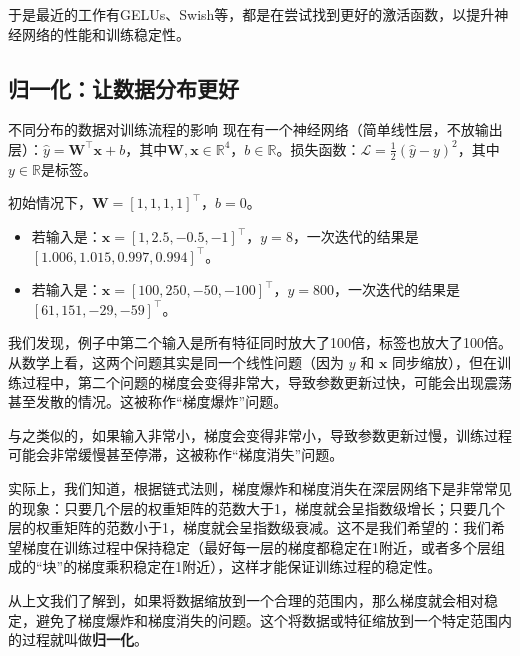 于是最近的工作有GELUs、Swish等，都是在尝试找到更好的激活函数，以提升神经网络的性能和训练稳定性。

\subsection{归一化：让数据分布更好}

\begin{example}{不同分布的数据对训练流程的影响}{}
    现在有一个神经网络（简单线性层，不放输出层）：$\hat{y} = \mathbf{W}^\top \mathbf{x} + b$，其中$\mathbf{W}, \mathbf{x} \in \mathbb{R}^{4}$，$b \in \mathbb{R}$。损失函数：$\mathcal{L} = \frac{1}{2}(\hat{y} - y)^2$，其中$y \in \mathbb{R}$是标签。

    初始情况下，$\mathbf{W} = [1, 1, 1, 1]^\top$，$b = 0$。

    \begin{itemize}
        \item 若输入是：$\mathbf{x} = [1, 2.5, -0.5, -1]^\top$，$y = 8$，一次迭代的结果是$[1.006,1.015,0.997,0.994]^\top$。
        \item 若输入是：$\mathbf{x} = [100, 250, -50, -100]^\top$，$y = 800$，一次迭代的结果是$[61,151,-29,-59]^\top$。
    \end{itemize}
\end{example}

我们发现，例子中第二个输入是所有特征同时放大了100倍，标签也放大了100倍。从数学上看，这两个问题其实是同一个线性问题（因为 $y$ 和 $\mathbf{x}$ 同步缩放），但在训练过程中，第二个问题的梯度会变得非常大，导致参数更新过快，可能会出现震荡甚至发散的情况。这被称作“梯度爆炸”问题。

与之类似的，如果输入非常小，梯度会变得非常小，导致参数更新过慢，训练过程可能会非常缓慢甚至停滞，这被称作“梯度消失”问题。

实际上，我们知道，根据链式法则，梯度爆炸和梯度消失在深层网络下是非常常见的现象：只要几个层的权重矩阵的范数大于1，梯度就会呈指数级增长；只要几个层的权重矩阵的范数小于1，梯度就会呈指数级衰减。这不是我们希望的：我们希望梯度在训练过程中保持稳定（最好每一层的梯度都稳定在1附近，或者多个层组成的“块”的梯度乘积稳定在1附近），这样才能保证训练过程的稳定性。

从上文我们了解到，如果将数据缩放到一个合理的范围内，那么梯度就会相对稳定，避免了梯度爆炸和梯度消失的问题。这个将数据或特征缩放到一个特定范围内的过程就叫做\textbf{归一化}。

